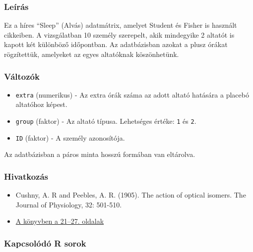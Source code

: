 \documentclass[
]{book}
\providecommand{\tightlist}{%
  \setlength{\itemsep}{0pt}\setlength{\parskip}{0pt}}
\begin{document}
\hypertarget{leuxedruxe1s-1}{%
\subsubsection*{Leírás}\label{leuxedruxe1s-1}}

Ez a híres ``Sleep'' (Alvás) adatmátrix, amelyet Student és Fisher is használt cikkeiben. A vizsgálatban 10 személy szerepelt, akik mindegyike 2 altatót is kapott két különböző időpontban. Az adatbázisban azokat a plusz órákat rögzítettük, amelyeket az egyes altatóknak köszönhetünk.

\hypertarget{vuxe1ltozuxf3k-1}{%
\subsubsection*{Változók}\label{vuxe1ltozuxf3k-1}}

\begin{itemize}
\tightlist
\item
  \texttt{extra} (numerikus) - Az extra órák száma az adott altató hatására a placebó altatóhoz képest.
\item
  \texttt{group} (faktor) - Az altató típusa. Lehetséges értéke: \texttt{1} és \texttt{2}.
\item
  \texttt{ID} (faktor) - A személy azonosítója.
\end{itemize}

Az adatbázisban a páros minta hosszú formában van eltárolva.

\hypertarget{hivatkozuxe1s-1}{%
\subsubsection*{Hivatkozás}\label{hivatkozuxe1s-1}}

\begin{itemize}
\tightlist
\item
  Cushny, A. R and Peebles, A. R. (1905). The action of optical isomers. The Journal of Physiology, 32: 501-510.
\item
  \href{https://jasp-stats.org/wp-content/uploads/2020/05/The_JASP_Data_Library_1st_Edition.pdf}{A könyvben a 21--27. oldalak}
\end{itemize}

\hypertarget{kapcsoluxf3duxf3-r-sorok-1}{%
\subsubsection*{Kapcsolódó R sorok}\label{kapcsoluxf3duxf3-r-sorok-1}}
\end{document}
